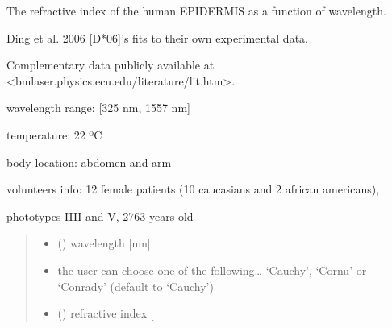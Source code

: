 \documentclass[letterpaper,10pt,english]{sphinxmanual}
\begin{document}
\begin{fulllineitems}
\label{\detokenize{05_refractive_index:skinoptics.refractive_index.n_EP_Ding}}
\pysigstartsignatures
{}
\pysigstopsignatures
\begin{DUlineblock}{0em}
\item[] The refractive index of the human EPIDERMIS as a function of wavelength.
\item[] Ding et al. 2006 {[}D*06{]}’s fits to their own experimental data.
\item[] Complementary data publicly available at \textless{}bmlaser.physics.ecu.edu/literature/lit.htm\textgreater{}.
\end{DUlineblock}

\begin{DUlineblock}{0em}
\item[] wavelength range: {[}325 nm, 1557 nm{]}
\item[] temperature: 22 ºC
\item[] body location: abdomen and arm
\item[] volunteers info: 12 female patients (10 caucasians and 2 african americans),
\item[] phototypes I\sphinxhyphen{}III and V, 27\sphinxhyphen{}63 years old
\end{DUlineblock}
\begin{quote}\begin{description}
\begin{itemize}
\item {} 
\sphinxAtStartPar
{} () \textendash{} wavelength {[}nm{]}

\item {} 
\sphinxAtStartPar
{} \textendash{} the user can choose one of the following… ‘Cauchy’, ‘Cornu’ or ‘Conrady’ (default to ‘Cauchy’)

\end{itemize}

\sphinxAtStartPar
\begin{itemize}
\item {} 
\sphinxAtStartPar
{} () \textendash{} refractive index {[}\sphinxhyphen{}{]}

\end{itemize}


\end{description}\end{quote}

\end{fulllineitems}
\end{document}
